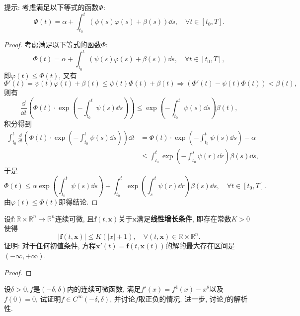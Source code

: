 \begin{quiza}
提示: 考虑满足以下等式的函数\(\varPhi\):\[\varPhi(t)=\alpha+\int_{t_0}^{t}\left(\psi(s)\varphi(s)+\beta(s)\right)\dd s,\quad\forall t\in[t_0,T].\]
\begin{proof}
考虑满足以下等式的函数\(\varPhi\):\[\varPhi(t)=\alpha+\int_{t_0}^{t}\left(\psi(s)\varphi(s)+\beta(s)\right)\dd s,\quad\forall t\in[t_0,T],\]即\(\varphi(t)\leqslant \varPhi(t)\), 又有\[\varPhi'(t)=\psi(t)\varphi(t)+\beta(t)\leqslant\psi(t)\varPhi(t)+\beta(t)\Rightarrow\left(\varPhi'(t)-\psi(t)\varPhi(t)\right)<\beta(t),\]则有\[\frac{\dd}{\dd t}\left(\varPhi(t)\cdot\exp\left(-\int_{t_0}^{t}\psi(s)\dd s\right)\right)\leqslant \exp\left(-\int_{t_0}^{t}\psi(s)\dd s\right)\beta(t),\]积分得到\[\begin{split}
\int_{t_0}^{t}\frac{\dd}{\dd t}\left(\varPhi(t)\cdot\exp\left(-\int_{t_0}^{t}\psi(s)\dd s\right)\right)\dd t&=\varPhi(t)\cdot\exp\left(-\int_{t_0}^{t}\psi(s)\dd s\right)-\alpha\\&\leqslant\int_{t_0}^{t}\exp\left(-\int_{t_0}^{s}\psi(r)\dd r\right)\beta(s)\dd s,
\end{split}\]于是\[\varPhi(t)\leqslant\alpha\exp\left(\int_{t_0}^{t}\psi(s)\dd s\right)+\int_{t_0}^{t}\exp\left(\int_{s}^{t}\psi(r)\dd r\right)\beta(s)\dd s,\quad\forall t\in[t_0,T].\]由\(\varphi(t)\leqslant \varPhi(t)\)即得结论.
\end{proof}
\woe 设\(\boldsymbol{f}:\mathbb{R}\times\mathbb{R}^n\rightarrow\mathbb{R}^n\)连续可微, 且\(\boldsymbol{f}\left(t,\boldsymbol{x}\right)\)关于\(\boldsymbol{x}\)满足\textbf{线性增长条件}, 即存在常数\(K>0\)使得\[|\boldsymbol{f}(t,\boldsymbol{x})|\leqslant K\left(|x|+1\right),\quad\forall(t,\boldsymbol{x})\in\mathbb{R}\times\mathbb{R}^n.\]证明: 对于任何初值条件, 方程\(\boldsymbol{x}'(t)=\boldsymbol{f}(t,\boldsymbol{x}(t))\)的解的最大存在区间是\((-\infty,+\infty)\).
\begin{proof}

\end{proof}
\woe 设\(\delta>0,f\)是\((-\delta,\delta)\)内的连续可微函数, 满足\(f'(x)=f^4(x)-x^8\)以及\(f(0)=0\), 试证明\(f\in C^{\infty}(-\delta,\delta)\), 并讨论\(f\)取正负的情况. 进一步, 讨论\(f\)的解析性.
\end{quiza}
